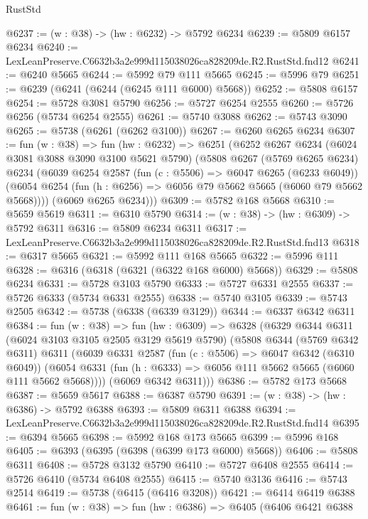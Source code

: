 \begin{lexlean}{RustStd}
\begin{coremodule}
@6237 := (w : @38) -> (hw : @6232) -> @5792 @6234
@6239 := @5809 @6157 @6234
@6240 := LexLeanPreserve.C6632b3a2e999d115038026ca828209de.R2.RustStd.fnd12
@6241 := @6240 @5665
@6244 := @5992 @79 @111 @5665
@6245 := @5996 @79
@6251 := @6239 (@6241 (@6244 (@6245 @111 @6000) @5668))
@6252 := @5808 @6157
@6254 := @5728 @3081 @5790
@6256 := @5727 @6254 @2555
@6260 := @5726 @6256 (@5734 @6254 @2555)
@6261 := @5740 @3088
@6262 := @5743 @3090
@6265 := @5738 (@6261 (@6262 @3100))
@6267 := @6260 @6265 @6234
@6307 := fun (w : @38) =>
  fun (hw : @6232) =>
  @6251
    (@6252
      @6267
      @6234
      (@6024 @3081 @3088 @3090 @3100 @5621 @5790)
      (@5808
        @6267
        (@5769 @6265 @6234)
        @6234
        (@6039
          @6254
          @2587
          (fun (c : @5506) => @6047 @6265 (@6233 @6049))
          (@6054 @6254 (fun (h : @6256) => @6056 @79 @5662 @5665 (@6060 @79 @5662 @5668))))
        (@6069 @6265 @6234)))
@6309 := @5782 @168 @5668
@6310 := @5659 @5619
@6311 := @6310 @5790
@6314 := (w : @38) -> (hw : @6309) -> @5792 @6311
@6316 := @5809 @6234 @6311
@6317 := LexLeanPreserve.C6632b3a2e999d115038026ca828209de.R2.RustStd.fnd13
@6318 := @6317 @5665
@6321 := @5992 @111 @168 @5665
@6322 := @5996 @111
@6328 := @6316 (@6318 (@6321 (@6322 @168 @6000) @5668))
@6329 := @5808 @6234
@6331 := @5728 @3103 @5790
@6333 := @5727 @6331 @2555
@6337 := @5726 @6333 (@5734 @6331 @2555)
@6338 := @5740 @3105
@6339 := @5743 @2505
@6342 := @5738 (@6338 (@6339 @3129))
@6344 := @6337 @6342 @6311
@6384 := fun (w : @38) =>
  fun (hw : @6309) =>
  @6328
    (@6329
      @6344
      @6311
      (@6024 @3103 @3105 @2505 @3129 @5619 @5790)
      (@5808
        @6344
        (@5769 @6342 @6311)
        @6311
        (@6039
          @6331
          @2587
          (fun (c : @5506) => @6047 @6342 (@6310 @6049))
          (@6054 @6331 (fun (h : @6333) => @6056 @111 @5662 @5665 (@6060 @111 @5662 @5668))))
        (@6069 @6342 @6311)))
@6386 := @5782 @173 @5668
@6387 := @5659 @5617
@6388 := @6387 @5790
@6391 := (w : @38) -> (hw : @6386) -> @5792 @6388
@6393 := @5809 @6311 @6388
@6394 := LexLeanPreserve.C6632b3a2e999d115038026ca828209de.R2.RustStd.fnd14
@6395 := @6394 @5665
@6398 := @5992 @168 @173 @5665
@6399 := @5996 @168
@6405 := @6393 (@6395 (@6398 (@6399 @173 @6000) @5668))
@6406 := @5808 @6311
@6408 := @5728 @3132 @5790
@6410 := @5727 @6408 @2555
@6414 := @5726 @6410 (@5734 @6408 @2555)
@6415 := @5740 @3136
@6416 := @5743 @2514
@6419 := @5738 (@6415 (@6416 @3208))
@6421 := @6414 @6419 @6388
@6461 := fun (w : @38) =>
  fun (hw : @6386) =>
  @6405
    (@6406
      @6421
      @6388

\end{coremodule}
\end{lexlean}
